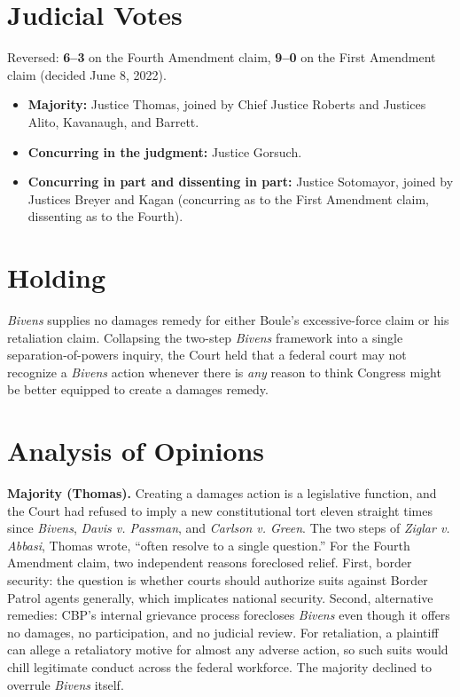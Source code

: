 \documentclass[12pt]{article}
\begin{document}
\section{Judicial Votes}

Reversed: \textbf{6--3} on the Fourth Amendment claim, \textbf{9--0} on the First Amendment claim (decided June 8, 2022).
\begin{itemize}
\item \textbf{Majority:} Justice Thomas, joined by Chief Justice Roberts and Justices Alito, Kavanaugh, and Barrett.
\item \textbf{Concurring in the judgment:} Justice Gorsuch.
\item \textbf{Concurring in part and dissenting in part:} Justice Sotomayor, joined by Justices Breyer and Kagan (concurring as to the First Amendment claim, dissenting as to the Fourth).
\end{itemize}

\section{Holding}

\textit{Bivens} supplies no damages remedy for either Boule's excessive-force claim or his retaliation claim. Collapsing the two-step \textit{Bivens} framework into a single separation-of-powers inquiry, the Court held that a federal court may not recognize a \textit{Bivens} action whenever there is \textit{any} reason to think Congress might be better equipped to create a damages remedy.

\section{Analysis of Opinions}

\textbf{Majority (Thomas).} Creating a damages action is a legislative function, and the Court had refused to imply a new constitutional tort eleven straight times since \textit{Bivens}, \textit{Davis v. Passman}, and \textit{Carlson v. Green}. The two steps of \textit{Ziglar v. Abbasi}, Thomas wrote, ``often resolve to a single question.'' For the Fourth Amendment claim, two independent reasons foreclosed relief. First, border security: the question is whether courts should authorize suits against Border Patrol agents generally, which implicates national security. Second, alternative remedies: CBP's internal grievance process forecloses \textit{Bivens} even though it offers no damages, no participation, and no judicial review. For retaliation, a plaintiff can allege a retaliatory motive for almost any adverse action, so such suits would chill legitimate conduct across the federal workforce. The majority declined to overrule \textit{Bivens} itself.
\end{document}
